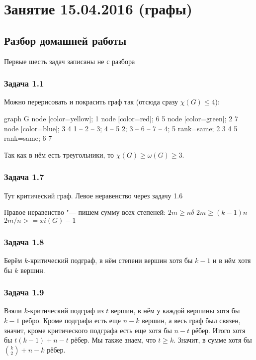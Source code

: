 \chapter{Занятие 15.04.2016 (графы)}

\section{Разбор домашней работы}
Первые шесть задач записаны не с разбора

\subsection{Задача 1.1}
	Можно перерисовать и покрасить граф так (отсюда сразу $\chi(G) \le 4$):
	\begin{center}
		\begin{dot2tex}[scale=0.8,options=-tmath]
			graph G {
				node [color=yellow]; 1
				node [color=red]; 6 5
				node [color=green]; 2 7
				node [color=blue]; 3 4
				1 -- {2 -- 3; 4 -- 5}
				{2; 3} -- 6 -- 7 -- {4; 5}
				{ rank=same; 2 3 4 5 }
				{ rank=same; 6 7 }
			}
		\end{dot2tex}
	\end{center}
	Так как в нём есть треугольники, то $\chi(G)\ge \omega(G) \ge 3$.
	\TODO

\subsection{Задача 1.7}
	Тут критический граф.
	Левое неравенство через задачу 1.6

	Правое неравенство "--- пишем сумму всех степеней:
	$2m \ge n\delta$
	$2m \ge (k-1)n$
	$2m/n >= xi(G) - 1$

\subsection{Задача 1.8}
	Берём $k$-критический подграф, в нём степени вершин хотя бы $k-1$ и в нём хотя бы $k$ вершин.

\subsection{Задача 1.9}
	Взяли $k$-критический подграф из $t$ вершин, в нём у каждой вершины хотя бы $k-1$ ребро.
	Кроме подграфа есть еще $n-k$ вершин, а весь граф был связен, значит, кроме критического подграфа есть еще хотя бы $n-t$ рёбер.
	Итого хотя бы $t(k-1)+n-t$ рёбер.
	Мы также знаем, что $t \ge k$.
	Значит, в сумме хотя бы $\binom{k}{2}+n-k$ рёбер.

